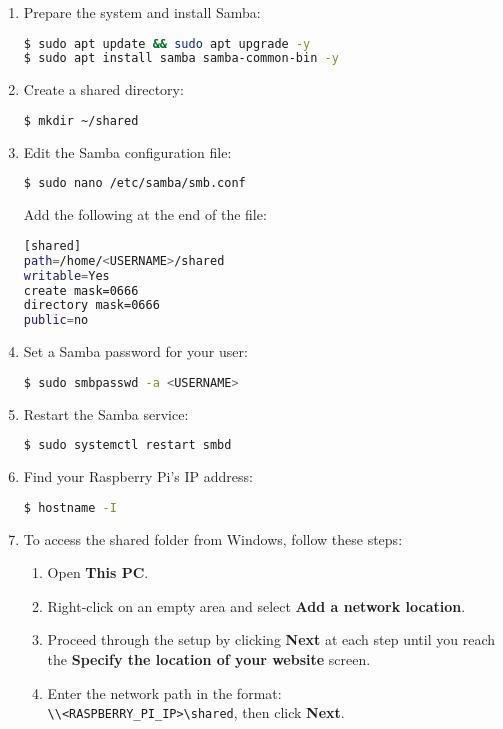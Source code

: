 \begin{enumerate}
\item Prepare the system and install Samba:
\begin{lstlisting}[language=bash, breaklines=true, breakatwhitespace=true, columns=fullflexible]
$ sudo apt update && sudo apt upgrade -y
$ sudo apt install samba samba-common-bin -y
\end{lstlisting}

\item Create a shared directory:
\begin{lstlisting}[language=bash, breaklines=true, breakatwhitespace=true, columns=fullflexible]
$ mkdir ~/shared
\end{lstlisting}

\item Edit the Samba configuration file:
\begin{lstlisting}[language=bash, breaklines=true, breakatwhitespace=true, columns=fullflexible]
$ sudo nano /etc/samba/smb.conf
\end{lstlisting}
Add the following at the end of the file:
\begin{lstlisting}[language=bash, breaklines=true, breakatwhitespace=true, columns=fullflexible]
[shared]
path=/home/<USERNAME>/shared
writable=Yes
create mask=0666
directory mask=0666
public=no
\end{lstlisting}

\item Set a Samba password for your user:
\begin{lstlisting}[language=bash, breaklines=true, breakatwhitespace=true, columns=fullflexible]
$ sudo smbpasswd -a <USERNAME>
\end{lstlisting}

\item Restart the Samba service:
\begin{lstlisting}[language=bash, breaklines=true, breakatwhitespace=true, columns=fullflexible]
$ sudo systemctl restart smbd
\end{lstlisting}

\item Find your Raspberry Pi's IP address:
\begin{lstlisting}[language=bash, breaklines=true, breakatwhitespace=true, columns=fullflexible]
$ hostname -I
\end{lstlisting}

\item To access the shared folder from Windows, follow these steps:
\begin{enumerate}
\item Open \textbf{This PC}.
\item Right-click on an empty area and select \textbf{Add a network location}.
\item Proceed through the setup by clicking \textbf{Next} at each step until you reach the \textbf{Specify the location of your website} screen.
\item Enter the network path in the format: \texttt{\\\textbackslash\textbackslash<RASPBERRY\_PI\_IP>\textbackslash shared}, then click \textbf{Next}.
\end{enumerate}

\end{enumerate}